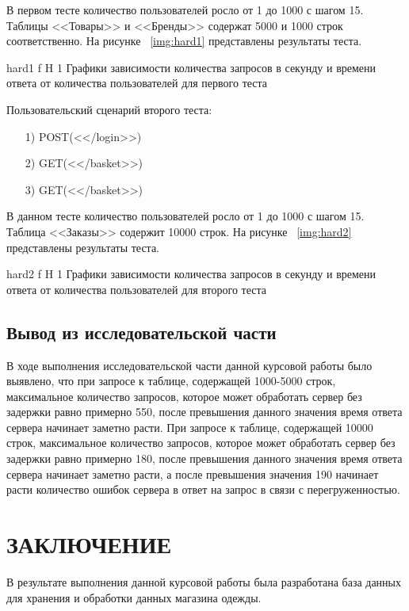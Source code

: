 \documentclass{bmstu}
\begin{document}
В первом тесте количество пользователей росло от 1 до 1000 с шагом 15. Таблицы <<Товары>> и <<Бренды>> содержат 5000 и 1000 строк соответственно. На рисунке ~\ref{img:hard1} представлены результаты теста.

{hard1}
{f}
{H}
{1\textwidth}
{Графики зависимости количества запросов в секунду и времени ответа от количества пользователей для первого теста}

Пользовательский сценарий второго теста:

\begin{enumerate}
	\item[1)]
	POST(<</login>>)
	\item[2)]
	GET(<</basket>>)
	\item[3)]
	GET(<</basket>>)
\end{enumerate}

В данном тесте количество пользователей росло от 1 до 1000 с шагом 15. Таблица <<Заказы>> содержит 10000 строк. На рисунке ~\ref{img:hard2} представлены результаты теста.

{hard2}
{f}
{H}
{1\textwidth}
{Графики зависимости количества запросов в секунду и времени ответа от количества пользователей для второго теста}

\section*{Вывод из исследовательской части}

В ходе выполнения исследовательской части данной курсовой работы было выявлено, что при запросе к таблице, содержащей 1000-5000 строк, максимальное количество запросов, которое может обработать сервер без задержки равно примерно 550, после превышения данного значения время ответа сервера начинает заметно расти. При запросе к таблице, содержащей 10000 строк, максимальное количество запросов, которое может обработать сервер без задержки равно примерно 180, после превышения данного значения время ответа сервера начинает заметно расти, а после превышения значения 190 начинает расти количество ошибок сервера в ответ на запрос в связи с перегруженностью.

{\centering \chapter*{ЗАКЛЮЧЕНИЕ}}

В результате выполнения данной курсовой работы была разработана база данных для хранения и обработки данных магазина одежды.
\end{document}

